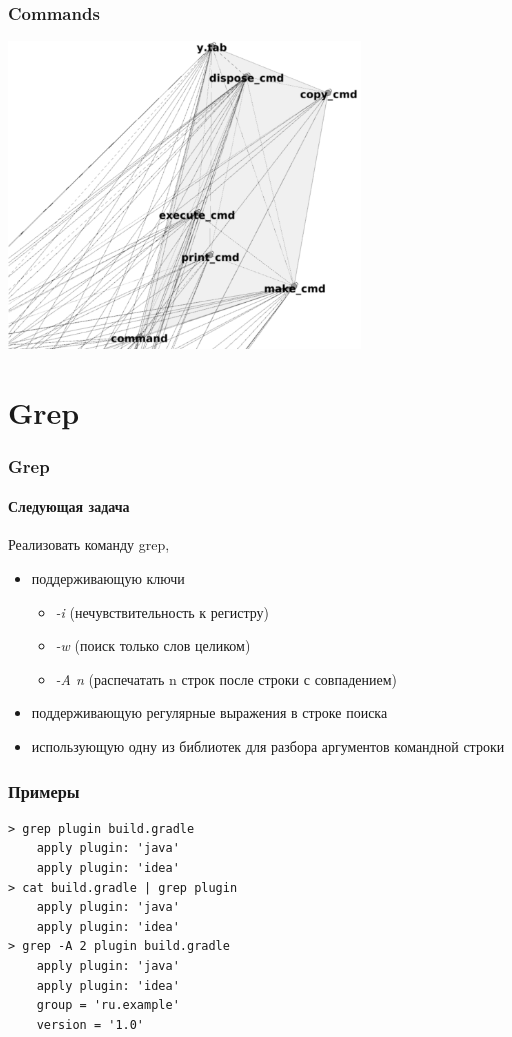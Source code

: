 \documentclass[xetex,mathserif,serif]{beamer}
\begin{document}
	\begin{frame}
		\frametitle{Commands}
		\begin{center}
			\includegraphics[width=0.7\textwidth]{bashCommands.png}
		\end{center}
	\end{frame}

	\section{Grep}

	\begin{frame}
		\frametitle{Grep}
		\framesubtitle{Следующая задача}
		Реализовать команду grep, 
		\begin{itemize}
			\item поддерживающую ключи
			\begin{itemize}
				\item \textit{-i} (нечувствительность к регистру)
				\item \textit{-w} (поиск только слов целиком)
				\item \textit{-A n} (распечатать n строк после строки с совпадением)
			\end{itemize}
			\item поддерживающую регулярные выражения в строке поиска
			\item использующую одну из библиотек для разбора аргументов командной строки
		\end{itemize}
	\end{frame}

	\begin{frame}[fragile]
		\frametitle{Примеры}
		\begin{verbatim}
> grep plugin build.gradle
    apply plugin: 'java'
    apply plugin: 'idea'
> cat build.gradle | grep plugin
    apply plugin: 'java'
    apply plugin: 'idea'
> grep -A 2 plugin build.gradle
    apply plugin: 'java'
    apply plugin: 'idea'
    group = 'ru.example'
    version = '1.0'
		\end{verbatim}
\end{frame}
\end{document}
